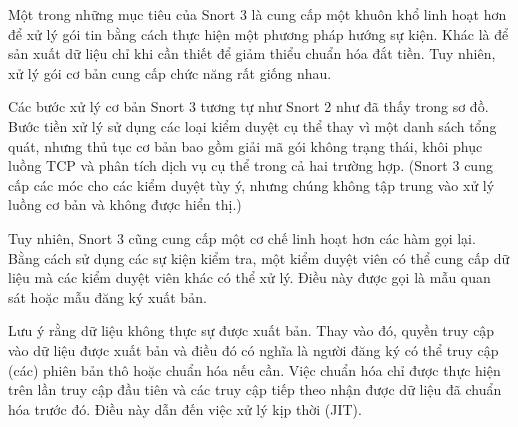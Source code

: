 \FloatBarrier
Một trong những mục tiêu của Snort 3 là cung cấp một khuôn khổ linh hoạt hơn để xử lý gói tin bằng cách thực hiện một phương pháp hướng sự kiện. 
Khác là để sản xuất dữ liệu chỉ khi cần thiết để giảm thiểu chuẩn hóa đắt tiền. 
Tuy nhiên, xử lý gói cơ bản cung cấp chức năng rất giống nhau.
\par
Các bước xử lý cơ bản Snort 3 tương tự như Snort 2 như đã thấy trong sơ đồ. 
Bước tiền xử lý sử dụng các loại kiểm duyệt cụ thể thay vì một danh sách tổng quát, nhưng thủ tục cơ bản bao gồm giải mã gói không trạng thái, khôi phục luồng TCP và phân tích dịch vụ cụ thể trong cả hai trường hợp. (Snort 3 cung cấp các móc cho các kiểm duyệt tùy ý, nhưng chúng không tập trung vào xử lý luồng cơ bản và không được hiển thị.)
\par
Tuy nhiên, Snort 3 cũng cung cấp một cơ chế linh hoạt hơn các hàm gọi lại. 
Bằng cách sử dụng các sự kiện kiểm tra, một kiểm duyệt viên có thể cung cấp dữ liệu mà các kiểm duyệt viên khác có thể xử lý. 
Điều này được gọi là mẫu quan sát hoặc mẫu đăng ký xuất bản.
\par
Lưu ý rằng dữ liệu không thực sự được xuất bản. 
Thay vào đó, quyền truy cập vào dữ liệu được xuất bản và điều đó có nghĩa là người đăng ký có thể truy cập (các) phiên bản thô hoặc chuẩn hóa nếu cần. 
Việc chuẩn hóa chỉ được thực hiện trên lần truy cập đầu tiên và các truy cập tiếp theo nhận được dữ liệu đã chuẩn hóa trước đó. 
Điều này dẫn đến việc xử lý kịp thời (JIT).
